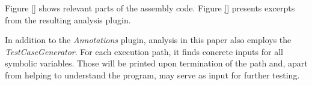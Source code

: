 Figure \ref{} shows relevant parts of the assembly code. Figure \ref{} presents excerpts from the resulting analysis plugin.

\bigskip

In addition to the \textit{Annotations} plugin, analysis in this paper also employs the \textit{TestCaseGenerator}.
For each execution path, it finds concrete inputs for all symbolic variables.
Those will be printed upon termination of the path and, apart from helping to understand the program, may serve as input for further testing.



\iffalse
§5 	Implementation (of the test case using S2E)
		> Vorgehen
		> Verwendete Konsistenzmodelle
		> Arbeitsweise von Selektoren/Analysatoren
\fi